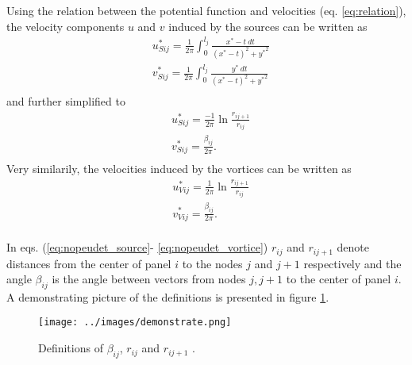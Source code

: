 \documentclass[a4paper,12pt]{article}
\begin{document}
Using the relation between the potential function and velocities (eq. \ref{eq:relation}), the velocity components $u$ and $v$ induced by the sources can be written as
\begin{equation}
\begin{split}
&u^*_{Sij} =  \frac{1}{2\pi} \int_0^{l_j} \frac{x^* - t\ dt}{(x^*-t)^2 + {y^*}^2}\\
&v^*_{Sij} =  \frac{1}{2\pi} \int_0^{l_j} \frac{y^* \ dt}{(x^*-t)^2 + {y^*}^2}\\
\end{split}
\end{equation}
and further simplified to 
\begin{equation}
\begin{split}
&u^*_{Sij} =  \frac{-1}{2\pi}\ln \frac{r_{ij+1}}{r_{ij}}\\
&v^*_{Sij} =  \frac{\beta_{ij}}{2\pi}.\\
\end{split}
\label{eq:nopeudet_source}
\end{equation}
Very similarily, the velocities induced by the vortices can be written as 
\begin{equation}
\begin{split}
&u^*_{Vij} =  \frac{1}{2\pi}\ln \frac{r_{ij+1}}{r_{ij}}\\
&v^*_{Vij} =  \frac{\beta_{ij}}{2\pi}.\\
\end{split}
\label{eq:nopeudet_vortice}
\end{equation}


In eqs. (\ref{eq:nopeudet_source}- \ref{eq:nopeudet_vortice}) $r_{ij}$ and $r_{ij+1}$ denote distances from the center of panel $i$ to the nodes $j$ and $j+1$ respectively and the angle $\beta_{ij}$ is the angle between vectors from nodes $j, j+1$ to the center of panel $i$. A demonstrating picture of the definitions is presented in figure \ref{fig:demonstrate}.
\begin{figure}[H]
\centering
  \texttt{[image: ../images/demonstrate.png]}
\caption{Definitions of $\beta_{ij}$,  $r_{ij}$ and $r_{ij+1}$ .}
\label{fig:demonstrate}
\end{figure}
\end{document}
